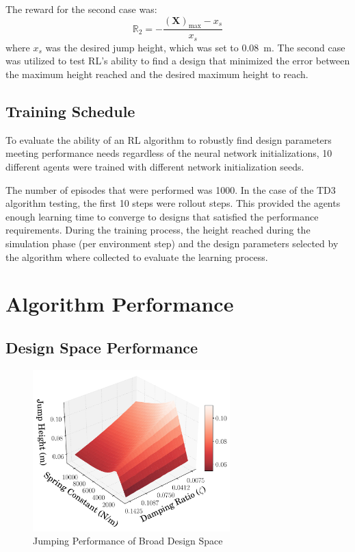 \documentclass[10pt,twocolumn,letterpaper]{article}
\begin{document}
The reward for the second case was:
%
\begin{equation}
        \mathbb{R}_2 = - \frac{\left (\textbf{X}  \right )_{\text{max}} - x_{s}}{x_{s}}
\end{equation}
%
where $x_s$ was the desired jump height, which was set to 0.08~m. The second case was utilized to test RL's ability to find a design that minimized the error between the maximum height reached and the desired maximum height to reach. 

\subsection{Training Schedule}

To evaluate the ability of an RL algorithm to robustly find design parameters meeting performance needs regardless of the neural network initializations, 10 different agents were trained with different network initialization seeds.

The number of episodes that were performed was 1000. In the case of the TD3 algorithm testing, the first 10 steps were rollout steps. This provided the agents enough learning time to converge to designs that satisfied the performance requirements. During the training process, the height reached during the simulation phase (per environment step) and the design parameters selected by the algorithm where collected to evaluate the learning process.


\section{Algorithm Performance} 
\label{sec:results}

\subsection{Design Space Performance}
%
\begin{figure}[!t]
        \begin{center}
        \includegraphics[width = 3in]{figures/ppo_vs_td3/Design_3D_Plot_0.075_.pdf}  
        \caption{Jumping Performance of Broad Design Space}
        \label{fig:spring_zeta_height}
        \end{center}
\end{figure}
%
\end{document}
